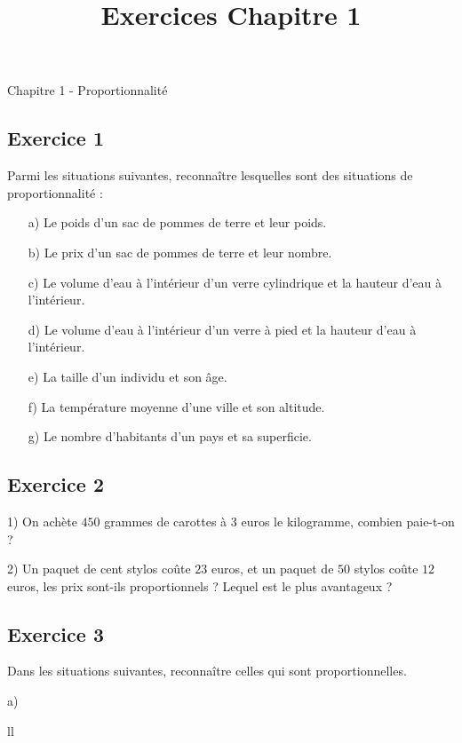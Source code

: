 \documentclass[12 pt]{extarticle}
\title{Exercices Chapitre 1}
\date{}
\theoremstyle{plain}
\begin{document}
\begin{center}{\Large Chapitre 1 - Proportionnalité}\\
 \end{center} 

\subsection*{Exercice 1}

Parmi les situations suivantes, reconnaître lesquelles sont des situations de proportionnalité : \begin{itemize}
\item[a)] Le poids d'un sac de pommes de terre et leur poids.
\item[b)] Le prix d'un sac de pommes de terre et leur nombre.
\item[c)] Le volume d'eau à l'intérieur d'un verre cylindrique 
et la hauteur d'eau à l'intérieur. 
\item[d)] Le volume d'eau à l'intérieur d'un verre à pied
et la hauteur d'eau à l'intérieur. 
\item[e)] La taille d'un individu et son âge.
\item[f)] La température moyenne d'une ville et son altitude. 
\item[g)] Le nombre d'habitants d'un pays et sa superficie. 
\end{itemize}

\subsection*{Exercice 2}

1) On achète $450$ grammes de carottes à $3$ euros le kilogramme, combien paie-t-on ? 

2) Un paquet de cent stylos coûte $23$ euros, et un paquet de $50$ 
stylos coûte $12$ euros, les prix sont-ils proportionnels ? Lequel est le plus avantageux ?

\subsection*{Exercice 3}

Dans les situations suivantes, reconnaître celles qui sont proportionnelles. 

a) \begin{table}[!H]{ll}
\\
\end{table} 


 	
\end{document}
